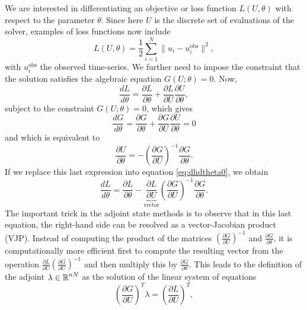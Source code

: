 We are interested in differentiating an objective or loss function $L(U, \theta)$ with respect to the parameter $\theta$. 
Since here $U$ is the discrete set of evaluations of the solver, examples of loss functions now include 
\begin{equation}
    L(U, \theta) 
    = 
    \frac{1}{2} \sum_{i=1}^N \| u_i - u_i^\text{obs} \|^2, 
\end{equation}
with $u_i^\text{obs}$ the observed time-series. 
We further need to impose the constraint that the solution satisfies the algebraic equation $G(U; \theta) = 0$.
Now,
\begin{equation}
    \frac{dL}{d\theta} 
    = 
    \frac{\partial L}{\partial \theta} 
    + 
    \frac{\partial L}{\partial U} \frac{\partial U}{\partial \theta},
    \label{eq:dhdtheta0}
\end{equation}
subject to the constraint $G(U; \theta)=0$, which gives
\begin{equation}
    \frac{dG}{d\theta} 
    = 
    \frac{\partial G}{\partial \theta} 
    + 
    \frac{\partial G}{\partial U} \frac{\partial U}{\partial \theta}
    =
    0
\end{equation}
and which is equivalent to 
\begin{equation}
    \frac{\partial U}{\partial \theta} 
    = 
    - \left( \frac{\partial G}{\partial U} \right)^{-1} \frac{\partial G}{\partial \theta}.
\end{equation}
If we replace this last expression into equation \eqref{eq:dhdtheta0}, we obtain
\begin{equation}
    \frac{dL}{d\theta} 
    =
    \frac{\partial L}{\partial \theta} 
    - 
    \underbrace{\frac{\partial L}{\partial U}}_{\text{vector}}
    \left( \frac{\partial G}{\partial U} \right)^{-1} 
    \frac{\partial G}{\partial \theta}.
    \label{eq:dhdtheta}
\end{equation}
The important trick in the adjoint state methods is to observe that in this last equation, the right-hand side can be resolved as a vector-Jacobian product (VJP).
Instead of computing the product of the matrices $\left( \frac{\partial G}{\partial U} \right)^{-1}$ and $\frac{\partial G}{\partial \theta}$, it is computationally more efficient first to compute the resulting vector from the operation $\frac{\partial L}{\partial U} \left( \frac{\partial G}{\partial U} \right)^{-1}$ and then multiply this by $\frac{\partial G}{\partial \theta}$.
This leads to the definition of the adjoint $\lambda \in \operatorname{\mathbb{R}}^{nN}$ as the solution of the linear system of equations 
\begin{equation}
    \left( \frac{\partial G}{\partial U}\right)^T \lambda 
    =  
    \left( \frac{\partial L}{\partial U} \right)^T,
    \label{eq:adjoint-state-equation}
\end{equation}
